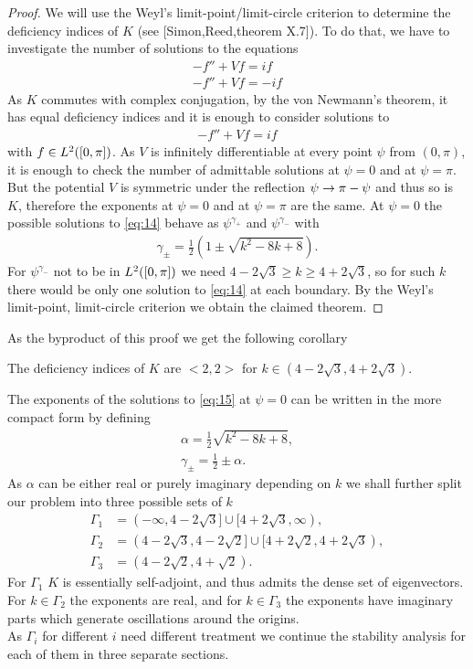 \begin{proof}
  We will use the Weyl's limit-point/limit-circle criterion to
  determine the deficiency indices of $K$ (see [Simon,Reed,theorem
  X.7]). To do that, we have to investigate the number of solutions to
  the equations
  \begin{align}
    \label{eq:12}
    -f''+Vf=if\\
    -f''+Vf=-if
  \end{align}
  As $K$ commutes with complex conjugation, by the von Newmann's
  theorem, it has equal deficiency indices and it is enough to
  consider solutions to
  \begin{align}
    \label{eq:14}
    -f''+Vf=if
  \end{align}
  with $f\in L^2([0,\pi])$. As $V$ is infinitely differentiable at every point
  $\psi$ from $(0,\pi)$, it is enough to check the number of
  admittable solutions at $\psi=0$ and at $\psi=\pi$. But the
  potential $V$ is symmetric under the reflection $\psi\rightarrow\pi-\psi$
  and thus so is $K$, therefore the exponents at $\psi=0$ and at
  $\psi=\pi$ are the same. At $\psi=0$ the possible solutions to
  \eqref{eq:14} behave as $\psi^{\gamma_+}$ and $\psi^{\gamma_-}$ with
  \begin{align}
    \label{eq:10}
    \gamma_\pm=\frac{1}{2}\left(1\pm\sqrt{k^2-8k+8}\right).
  \end{align}
  For $\psi^{\gamma_-}$ not to be in $L^2([0,\pi])$ we need $4-2\sqrt{3}\ge
  k\ge4+2\sqrt{3}$, so for such $k$ there would be only one solution
  to \eqref{eq:14} at each boundary. By the Weyl's limit-point,
  limit-circle criterion we obtain the claimed theorem.
\end{proof}
As the byproduct of this proof we get the following corollary
\begin{corollary}
  The deficiency indices of $K$ are $<2,2>$ for
  $k\in(4-2\sqrt{3},4+2\sqrt{3})$.
\end{corollary}
The exponents of the solutions to \eqref{eq:15} at $\psi=0$ can be
written in the more compact form by defining
\begin{align}
  \label{eq:18}
  \alpha=\frac{1}{2}\sqrt{k^2-8k+8},\\
  \gamma_\pm=\frac{1}{2}\pm\alpha.
\end{align}
As $\alpha$ can be either real or purely imaginary depending on $k$ we
shall further split our problem into three possible sets of $k$
\begin{align}
  \label{eq:20}
  \Gamma_1&=(-\infty,4-2\sqrt{3}]\cup[4+2\sqrt{3},\infty),\\
  \Gamma_2&=(4-2\sqrt{3},4-2\sqrt{2}]\cup[4+2\sqrt{2},4+2\sqrt{3}),\\
  \Gamma_3&=(4-2\sqrt{2},4+\sqrt{2}).
\end{align}
For $\Gamma_1$ $K$ is essentially self-adjoint, and thus admits the
dense set of eigenvectors. For $k\in\Gamma_2$ the exponents are real,
and for $k\in\Gamma_3$ the exponents have imaginary parts which
generate oscillations around the origins.\\

As $\Gamma_i$ for different $i$ need different treatment we continue
the stability analysis for each of them in three separate sections.

